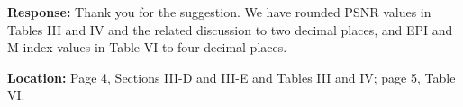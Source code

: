 \documentclass[11pt,letterpaper]{article}
\begin{document}
\medskip
\textbf{Response:} Thank you for the suggestion. We have rounded PSNR values in Tables III and IV and the related discussion to two decimal places, and EPI and M-index values in Table VI to four decimal places.

\textbf{Location:} Page 4, Sections III-D and III-E and Tables III and IV; page 5, Table VI.
\end{document}
